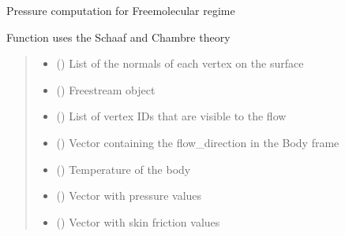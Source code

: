 \documentclass[letterpaper,10pt,english]{sphinxmanual}
\begin{document}
\begin{fulllineitems}
\label{\detokenize{modules:aerothermo.aerodynamics_module_freemolecular}}
\pysigstartsignatures
{}
\pysigstopsignatures
\sphinxAtStartPar
Pressure computation for Free\sphinxhyphen{}molecular regime

\sphinxAtStartPar
Function uses the Schaaf and Chambre theory
\begin{quote}\begin{description}
\begin{itemize}
\item {} 
\sphinxAtStartPar
{} () \textendash{} List of the normals of each vertex on the surface

\item {} 
\sphinxAtStartPar
{} () \textendash{} Freestream object

\item {} 
\sphinxAtStartPar
{} () \textendash{} List of vertex IDs that are visible to the flow

\item {} 
\sphinxAtStartPar
{} () \textendash{} Vector containing the flow\_direction in the Body frame

\item {} 
\sphinxAtStartPar
{} () \textendash{} Temperature of the body

\end{itemize}

\sphinxAtStartPar
\begin{itemize}
\item {} 
\sphinxAtStartPar
{} () \textendash{} Vector with pressure values

\item {} 
\sphinxAtStartPar
{} () \textendash{} Vector with skin friction values

\end{itemize}


\end{description}\end{quote}

\end{fulllineitems}
\end{document}
